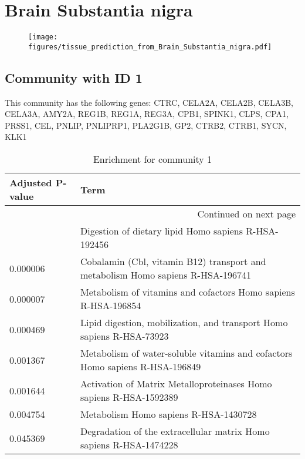 
\section*{Brain Substantia nigra}
\begin{figure}[h!]
\centering
\texttt{[image: figures/tissue\_prediction\_from\_Brain\_Substantia\_nigra.pdf]}
\end{figure}



\subsection*{Community with ID 1}
This community has the following genes: CTRC, CELA2A, CELA2B, CELA3B, CELA3A, AMY2A, REG1B, REG1A, REG3A, CPB1, SPINK1, CLPS, CPA1, PRSS1, CEL, PNLIP, PNLIPRP1, PLA2G1B, GP2, CTRB2, CTRB1, SYCN, KLK1
\\
\begin{longtable}{p{2.4cm}p{14.5cm}}
\caption{Enrichment for community 1}\\
\toprule
Adjusted \newline P-value &                                                                             Term \\
\midrule
\endhead
\midrule
\multicolumn{2}{r}{{Continued on next page}} \\
\midrule
\endfoot

\bottomrule
\endlastfoot
                 0.000005 &                             Digestion of dietary lipid Homo sapiens R-HSA-192456 \\
                 0.000006 &  Cobalamin (Cbl, vitamin B12) transport and metabolism Homo sapiens R-HSA-196741 \\
                 0.000007 &                   Metabolism of vitamins and cofactors Homo sapiens R-HSA-196854 \\
                 0.000469 &            Lipid digestion, mobilization, and transport Homo sapiens R-HSA-73923 \\
                 0.001367 &     Metabolism of water-soluble vitamins and cofactors Homo sapiens R-HSA-196849 \\
                 0.001644 &               Activation of Matrix Metalloproteinases Homo sapiens R-HSA-1592389 \\
                 0.004754 &                                            Metabolism Homo sapiens R-HSA-1430728 \\
                 0.045369 &               Degradation of the extracellular matrix Homo sapiens R-HSA-1474228 \\
\end{longtable}


